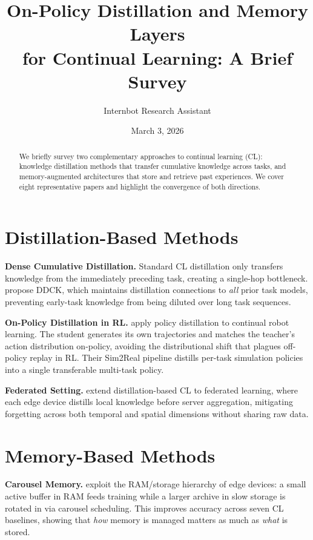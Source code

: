 \documentclass[11pt]{article}
\title{On-Policy Distillation and Memory Layers\\for Continual Learning: A Brief Survey}
\author{Internbot Research Assistant}
\date{March 3, 2026}
\begin{document}
\maketitle

\begin{abstract}
We briefly survey two complementary approaches to continual learning (CL): knowledge distillation methods that transfer cumulative knowledge across tasks, and memory-augmented architectures that store and retrieve past experiences. We cover eight representative papers and highlight the convergence of both directions.
\end{abstract}

\section{Distillation-Based Methods}

\textbf{Dense Cumulative Distillation.}
Standard CL distillation only transfers knowledge from the immediately preceding task, creating a single-hop bottleneck. \citet{shi2024densely} propose DDCK, which maintains distillation connections to \emph{all} prior task models, preventing early-task knowledge from being diluted over long task sequences.

\textbf{On-Policy Distillation in RL.}
\citet{traore2019continual} apply policy distillation to continual robot learning. The student generates its own trajectories and matches the teacher's action distribution on-policy, avoiding the distributional shift that plagues off-policy replay in RL. Their Sim2Real pipeline distills per-task simulation policies into a single transferable multi-task policy.

\textbf{Federated Setting.}
\citet{usmanova2022federated} extend distillation-based CL to federated learning, where each edge device distills local knowledge before server aggregation, mitigating forgetting across both temporal and spatial dimensions without sharing raw data.

\section{Memory-Based Methods}

\textbf{Carousel Memory.}
\citet{lee2021carousel} exploit the RAM/storage hierarchy of edge devices: a small active buffer in RAM feeds training while a larger archive in slow storage is rotated in via carousel scheduling. This improves accuracy across seven CL baselines, showing that \emph{how} memory is managed matters as much as \emph{what} is stored.
\end{document}
